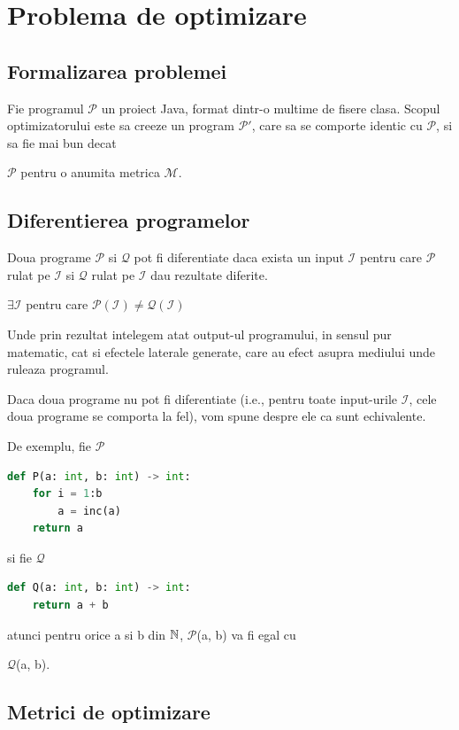 \newcommand{\s}[1]{
	\(\mathcal{#1}\)}

\chapter{Problema de optimizare}

\section{Formalizarea problemei}

Fie programul \s{P} un proiect Java, format dintr-o multime de fisere
clasa.  Scopul optimizatorului este sa creeze un program \s{P'}, care
sa se comporte identic cu \s{P}, si sa fie mai bun decat
\s{P} pentru o anumita metrica \s{M}.

\section{Diferentierea programelor}

Doua programe \s{P} si \s{Q} pot fi diferentiate daca
exista un input \s{I} pentru care \s{P} rulat pe \s{I}
si \s{Q} rulat pe \s{I} dau rezultate diferite.

\(\exists \mathcal{I}\) pentru care \(\mathcal{P}(\mathcal{I}) \ne
\mathcal{Q}(\mathcal{I}) \)

Unde prin rezultat intelegem atat output-ul programului, in
sensul pur matematic, cat si efectele laterale generate, care au
efect asupra mediului unde ruleaza programul.

Daca doua programe nu pot fi diferentiate (i.e., pentru toate
input-urile \s{I}, cele doua programe se comporta la fel), vom
spune despre ele ca sunt echivalente.

De exemplu, fie \s{P}

\begin{lstlisting}[language=Python,label={programul_p}]
def P(a: int, b: int) -> int:
    for i = 1:b
        a = inc(a)
    return a
\end{lstlisting}

si fie \s{Q}

\begin{lstlisting}[language=Python,label={programul_q}]
def Q(a: int, b: int) -> int:
    return a + b
\end{lstlisting}

atunci pentru orice a si b din $\mathbb{N}$, \s{P}(a, b) va fi egal cu
\s{Q}(a, b).

\section{Metrici de optimizare}

